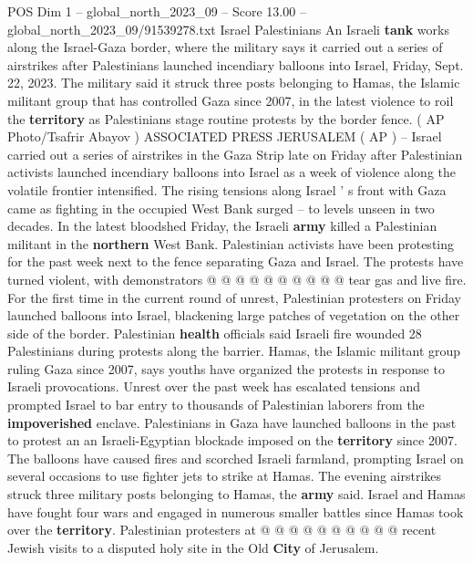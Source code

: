 \begin{textsample}{POS Dim 1 – global\_north\_2023\_09 – Score 13.00 – global\_north\_2023\_09/91539278.txt}  \label{ex:f1_pos_355}
Israel Palestinians An Israeli \textbf{tank} works along the Israel-Gaza border, where the military says it carried out a series of airstrikes after Palestinians launched incendiary balloons into Israel, Friday, Sept. 22, 2023.
The military said it struck three posts belonging to Hamas, the Islamic militant group that has controlled Gaza since 2007, in the latest violence to roil the \textbf{territory} as Palestinians stage routine protests by the border fence. ( AP Photo/Tsafrir Abayov ) ASSOCIATED PRESS JERUSALEM ( AP ) -- Israel carried out a series of airstrikes in the Gaza Strip late on Friday after Palestinian activists launched incendiary balloons into Israel as a week of violence along the volatile frontier intensified.
The rising tensions along Israel ' s front with Gaza came as fighting in the occupied West Bank surged -- to levels unseen in two decades.
In the latest bloodshed Friday, the Israeli \textbf{army} killed a Palestinian militant in the \textbf{northern} West Bank.
Palestinian activists have been protesting for the past week next to the fence separating Gaza and Israel.
The protests have turned violent, with demonstrators @ @ @ @ @ @ @ @ @ @ tear gas and live fire.
For the first time in the current round of unrest, Palestinian protesters on Friday launched balloons into Israel, blackening large patches of vegetation on the other side of the border.
Palestinian \textbf{health} officials said Israeli fire wounded 28 Palestinians during protests along the barrier.
Hamas, the Islamic militant group ruling Gaza since 2007, says youths have organized the protests in response to Israeli provocations.
Unrest over the past week has escalated tensions and prompted Israel to bar entry to thousands of Palestinian laborers from the \textbf{impoverished} enclave.
Palestinians in Gaza have launched balloons in the past to protest an an Israeli-Egyptian blockade imposed on the \textbf{territory} since 2007.
The balloons have caused fires and scorched Israeli farmland, prompting Israel on several occasions to use fighter jets to strike at Hamas.
The evening airstrikes struck three military posts belonging to Hamas, the \textbf{army} said.
Israel and Hamas have fought four wars and engaged in numerous smaller battles since Hamas took over the \textbf{territory}.
Palestinian protesters at @ @ @ @ @ @ @ @ @ @ recent Jewish visits to a disputed holy site in the Old \textbf{City} of Jerusalem.

\end{textsample}
